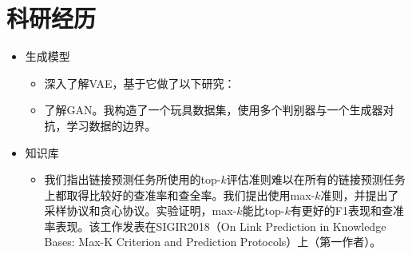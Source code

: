 \documentclass{resume}
\begin{document}

\section{科研经历}
\begin{itemize}
\item 生成模型
\begin{itemize}
	\item 深入了解VAE，基于它做了以下研究：
\item 了解GAN。我构造了一个玩具数据集，使用多个判别器与一个生成器对抗，学习数据的边界。
\end{itemize}

\item 知识库
\begin{itemize}

\item 我们指出链接预测任务所使用的top-$k$评估准则难以在所有的链接预测任务上都取得比较好的查准率和查全率。我们提出使用max-$k$准则，并提出了采样协议和贪心协议。实验证明，max-$k$能比top-$k$有更好的F1表现和查准率表现。该工作发表在SIGIR2018（On Link Prediction in Knowledge Bases: Max-K Criterion and Prediction Protocols）上（第一作者）。



\end{itemize}

\end{itemize}
\end{document}

